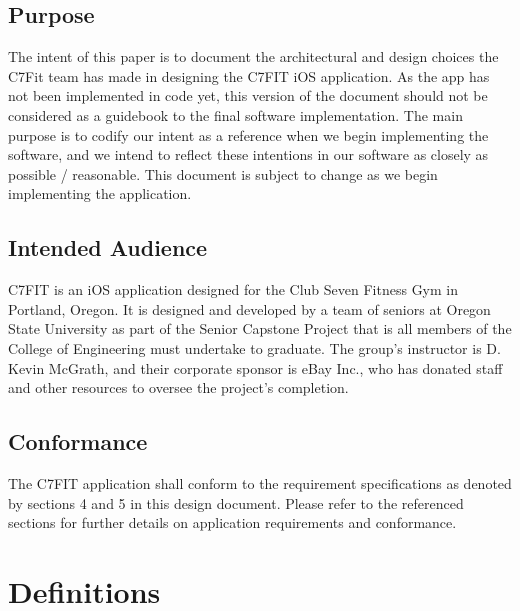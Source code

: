 \documentclass[letterpaper,10pt,titlepage]{article}
\begin{document}
\subsection{Purpose}
The intent of this paper is to document the architectural and design choices the C7Fit team has made in designing the C7FIT iOS application. As the app has not been implemented in code  yet, this version of the document should not be considered as a guidebook to the final software implementation. The main purpose is to codify our intent as a reference when we begin implementing the software, and we intend to reflect these intentions in our software as closely as possible / reasonable. This document is subject to change as we begin implementing the application.

\subsection{Intended Audience}
C7FIT is an iOS application designed for the Club Seven Fitness Gym in Portland, Oregon. It is designed and developed by a team of seniors at Oregon State University as part of the Senior Capstone Project that is all members of the College of Engineering must undertake to graduate. The group's instructor is D. Kevin McGrath, and their corporate sponsor is eBay Inc., who has donated staff and other resources to oversee the project's completion.

\subsection{Conformance}
The C7FIT application shall conform to the requirement specifications as denoted by sections 4 and 5 in this design document. Please refer to the referenced sections for further details on application requirements and conformance.

\section{Definitions}
\end{document}
